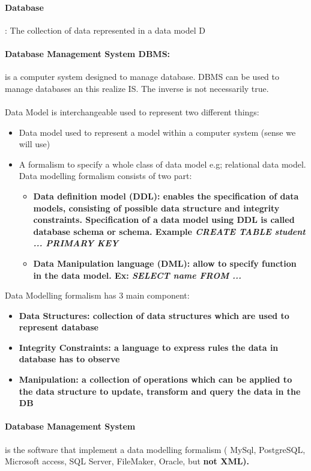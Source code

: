  
 \paragraph{Database}: The collection of data represented in a data model D


\paragraph{Database Management System DBMS:} is a computer system designed to manage database. DBMS can be used to manage databases an this realize IS. The inverse is not necessarily true. 
\\
\\ Data Model is interchangeable used to represent two different things:

\begin{itemize}
	\item Data model used to represent a model within 	a computer system (sense we will use)	
	\item A formalism to specify a whole class of data model e.g; relational data model. Data modelling formalism consists of two part:
	
	\begin{itemize}
		\item \bf{Data definition model (DDL):} enables the specification of data models, consisting of possible data structure and integrity constraints. Specification of a data model using DDL is called \bf{database schema or schema}. Example \textit{CREATE TABLE student ... PRIMARY KEY}
		\item \bf{Data Manipulation language (DML):} allow to specify function in the data model. Ex: \textit{SELECT name FROM ...}
	\end{itemize}
\end{itemize}
Data Modelling formalism has 3 main component:

\begin{itemize}
	\item \bf{Data Structures:} collection of data structures which are used to represent database
	\item \bf{Integrity Constraints:} a language to express rules the data in database has to observe
	\item \bf{Manipulation:} a collection of operations which can be applied to the data structure to update, transform and query the data in the DB
\end{itemize}

\paragraph{Database Management System} is the software that implement a data modelling formalism ( MySql, PostgreSQL, Microsoft access, SQL Server, FileMaker, Oracle, but \bf{not} XML).


